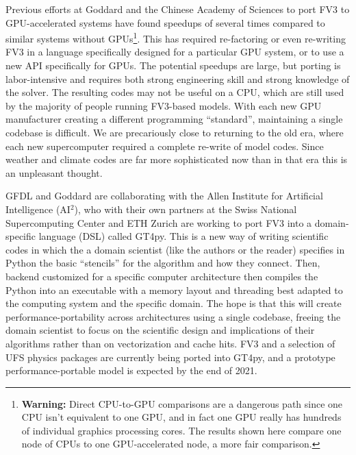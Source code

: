 \documentclass[10pt,letterpaper,margin=1in]{memoir}
\begin{document}
Previous efforts at Goddard and the Chinese Academy of Sciences to port FV3 to GPU-accelerated systems have found speedups of several times compared to similar systems without GPUs\footnote{\textbf{Warning:} Direct CPU-to-GPU comparisons are a dangerous path since one CPU isn't equivalent to one GPU, and in fact one GPU really has hundreds of individual graphics processing cores. The results shown here compare one node of CPUs to one GPU-accelerated node, a more fair comparison.}. This has required re-factoring or even re-writing FV3 in a language specifically designed for a particular GPU system, or to use a new API specifically for GPUs. The potential speedups are large, but porting is labor-intensive and requires both strong engineering skill and strong knowledge of the solver. The resulting codes may not be useful on a CPU, which are still used by the majority of people running FV3-based models. With each new GPU manufacturer creating a different programming ``standard'', maintaining a single codebase is difficult. 
We are precariously close to returning to the old era, where each new supercomputer required a complete re-write of model codes. Since weather and climate codes are far more sophisticated now than in that era this is an unpleasant thought.

GFDL and Goddard are collaborating with the Allen Institute for Artificial Intelligence (AI$^2$), who with their own partners at the Swiss National Supercomputing Center and ETH Zurich are working to port FV3 into a domain-specific language (DSL) called GT4py. This is a new way of writing scientific codes in which the a domain scientist (like the authors or the reader) specifies in Python the basic ``stencils'' for the algorithm and how they connect. Then, backend customized for a specific computer architecture then compiles the Python into an executable with a memory layout and threading best adapted to the computing system and the specific domain. The hope is that this will create performance-portability across architectures using a single codebase, freeing the domain scientist to focus on the scientific design and implications of their algorithms rather than on vectorization and cache hits. FV3 and a selection of UFS physics packages are currently being ported into GT4py, and a prototype performance-portable model is expected by the end of 2021.

\end{document}
